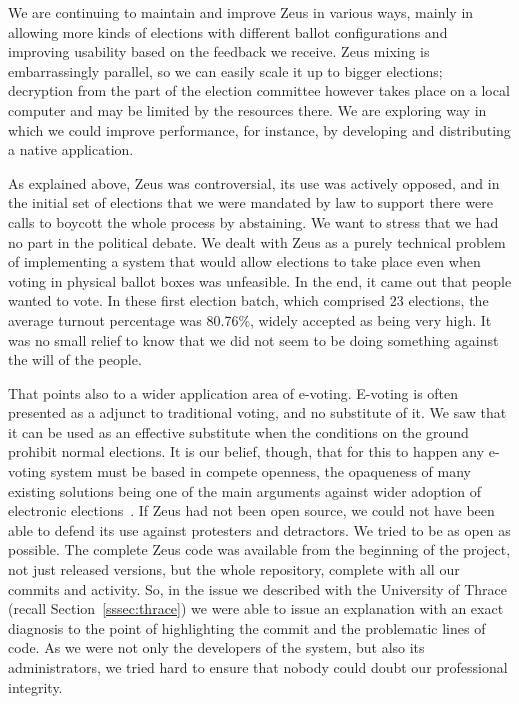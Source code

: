 \documentclass[letterpaper,10pt]{article}
\begin{document}
We are continuing to maintain and improve Zeus in various ways, mainly
in allowing more kinds of elections with different ballot
configurations and improving usability based on the feedback we
receive. Zeus mixing is embarrassingly parallel, so we can easily scale
it up to bigger elections; decryption from the part of the election
committee however takes place on a local computer and may be limited
by the resources there. We are exploring way in which we could improve
performance, for instance, by developing and distributing a native
application.

As explained above, Zeus was controversial, its use was actively
opposed, and in the initial set of elections that we were mandated by
law to support there were calls to boycott the whole process by
abstaining. We want to stress that we had no part in the political
debate. We dealt with Zeus as a purely technical problem of
implementing a system that would allow elections to take place even
when voting in physical ballot boxes was unfeasible. In the end, it
came out that people wanted to vote. In these first election batch,
which comprised 23 elections, the average turnout percentage was
80.76\%, widely accepted as being very high. It was no small relief to
know that we did not seem to be doing something against the will of
the people.

That points also to a wider application area of e-voting. E-voting is
often presented as a adjunct to traditional voting, and no substitute
of it. We saw that it can be used as an effective substitute when the
conditions on the ground prohibit normal elections. It is our belief,
though, that for this to happen any e-voting system must be based in
compete openness, the opaqueness of many existing solutions being one
of the main arguments against wider adoption of electronic
elections~\cite{simons:2012,jones:2012}. If Zeus had not been open
source, we could not have been able to defend its use against
protesters and detractors. We tried to be as open as
possible. The complete Zeus code was available from the beginning of
the project, not just released versions, but the whole repository,
complete with all our commits and activity. So, in the issue we
described with the University of Thrace (recall
Section~\ref{sssec:thrace}) we were able to issue an explanation with
an exact diagnosis to the point of highlighting the commit and the
problematic lines of code. As we were not only the developers of the
system, but also its administrators, we tried hard to ensure that
nobody could doubt our professional integrity.
\end{document}
